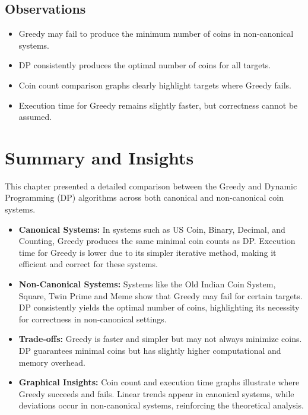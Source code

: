\documentclass[12pt,a4paper]{report}
\begin{document}
\subsection{Observations}
\begin{itemize}
    \item Greedy may fail to produce the minimum number of coins in non-canonical systems.  
    \item DP consistently produces the optimal number of coins for all targets.  
    \item Coin count comparison graphs clearly highlight targets where Greedy fails.  
    \item Execution time for Greedy remains slightly faster, but correctness cannot be assumed.
\end{itemize}

\section{Summary and Insights}
\label{sec:comparison_summary}

This chapter presented a detailed comparison between the Greedy and Dynamic Programming (DP) algorithms across both canonical and non-canonical coin systems.

\begin{itemize}
    \item \textbf{Canonical Systems:} In systems such as US Coin, Binary, Decimal, and Counting, Greedy produces the same minimal coin counts as DP. Execution time for Greedy is lower due to its simpler iterative method, making it efficient and correct for these systems.

    \item \textbf{Non-Canonical Systems:} Systems like the Old Indian Coin System, Square, Twin Prime and Meme show that Greedy may fail for certain targets. DP consistently yields the optimal number of coins, highlighting its necessity for correctness in non-canonical settings.

    \item \textbf{Trade-offs:} Greedy is faster and simpler but may not always minimize coins. DP guarantees minimal coins but has slightly higher computational and memory overhead.

    \item \textbf{Graphical Insights:} Coin count and execution time graphs illustrate where Greedy succeeds and fails. Linear trends appear in canonical systems, while deviations occur in non-canonical systems, reinforcing the theoretical analysis.
\end{itemize}
\end{document}
